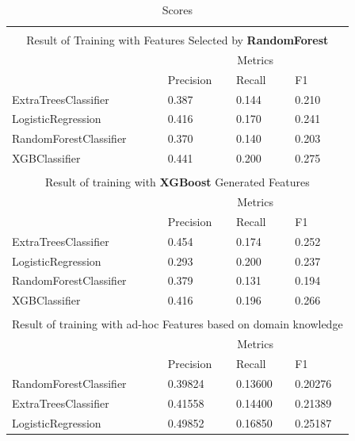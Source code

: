 \documentclass[twoside,openright,titlepage,numbers=noenddot,headinclude,%
               footinclude=true,cleardoublepage=empty,abstractoff,BCOR=5mm,%
               paper=a4,fontsize=11pt,ngerman,american]{scrreprt}
\numberwithin{theorem}{chapter}
\numberwithin{definition}{chapter}
\numberwithin{algorithm}{chapter}
\numberwithin{figure}{chapter}
\numberwithin{table}{chapter}
\numberwithin{equation}{chapter}
\begin{document}
\setlength{\extrarowheight}{1.5pt}
\begin{table}[!htbp]
\caption{Scores} %
\centering %
\begin{tabular}{|p{6cm}|p{1.5cm}|p{1.5cm}|p{1.5cm}|} %
\hline %
\multicolumn{4}{|c|}{}\\
\multicolumn{4}{|c|}{Result of Training with Features Selected by \textbf{RandomForest}}\\[5pt]
\hline 
& \multicolumn{3}{c|}{Metrics}\\[5pt]
\cline{2-4} 
& Precision & Recall & F1\\[0.5ex]
\hline %

ExtraTreesClassifier     &  0.387       &  0.144     &  0.210     \\ 
LogisticRegression       &  0.416       &  0.170     &  0.241     \\ 
RandomForestClassifier   &  0.370       &  0.140     &  0.203     \\ 
XGBClassifier            &  0.441       &  0.200     &  0.275     \\ 


\hline%

\multicolumn{4}{|c|}{}\\
\multicolumn{4}{|c|}{Result of training with \textbf{XGBoost} Generated Features}\\[5pt]
\hline 
& \multicolumn{3}{c|}{Metrics}\\[5pt]
\cline{2-4} 
& Precision & Recall & F1\\[0.5ex]
\hline %

ExtraTreesClassifier     & 0.454       & 0.174     & 0.252\\     
LogisticRegression       & 0.293       & 0.200     & 0.237\\     
RandomForestClassifier   & 0.379       & 0.131     & 0.194\\     
XGBClassifier            & 0.416       & 0.196     & 0.266\\

\hline%

\multicolumn{4}{|c|}{}\\
\multicolumn{4}{|c|}{Result of training with ad-hoc Features based on domain knowledge}\\[5pt]
\hline 
& \multicolumn{3}{c|}{Metrics}\\[5pt]
\cline{2-4} 
& Precision & Recall & F1\\[0.5ex]
\hline %

RandomForestClassifier      &  0.39824&  0.13600&  0.20276\\ 
ExtraTreesClassifier        &  0.41558&  0.14400&  0.21389\\ 
LogisticRegression          &  0.49852&  0.16850&  0.25187\\ 

\hline %

\end{tabular}
\label{benchMarkScoresTable}
\end{table}
\end{document}
